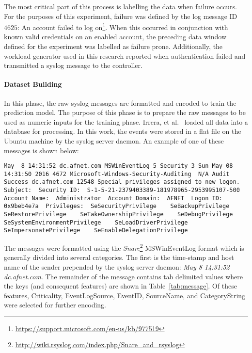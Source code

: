 The most critical part of this process is labelling the data when failure
occurs.  For the purposes of this experiment, failure was defined by the log
message ID $4625$: An account failed to log
on\footnote{\url{https://support.microsoft.com/en-us/kb/977519}}.  When this
occurred in conjunction with known valid credentials on an enabled account, the
preceding data window defined for the experiment was labelled as failure prone.
Additionally, the workload generator used in this research reported when
authentication failed and transmitted a syslog message to the controller.  

\paragraph{Dataset Building} \label{sec:dataset.building}
In this phase, the raw syslog messages are formatted and encoded to train the
prediction model.  The purpose of this phase is to prepare the raw messages to
be used as numeric inputs for the training phase.  Irrera, et
al.~\cite{irrera2015} loaded all data into a database for processing.  In this
work, the events were stored in a flat file on the Ubuntu machine by
the syslog server daemon.  An example of one of these messages is shown below:

\begin{lstlisting}
May  8 14:31:52 dc.afnet.com MSWinEventLog 5 Security 3 Sun May 08 14:31:50 2016 4672 Microsoft-Windows-Security-Auditing  N/A Audit Success dc.afnet.com 12548 Special privileges assigned to new logon.  Subject:  Security ID:  S-1-5-21-2379403389-181978965-2953995107-500  Account Name:  Administrator  Account Domain:  AFNET  Logon ID:  0x9beb4e7a  Privileges:  SeSecurityPrivilege    SeBackupPrivilege    SeRestorePrivilege    SeTakeOwnershipPrivilege    SeDebugPrivilege    SeSystemEnvironmentPrivilege    SeLoadDriverPrivilege    SeImpersonatePrivilege    SeEnableDelegationPrivilege
\end{lstlisting}

The messages were formatted using the
\emph{Snare}\footnote{\url{http://wiki.rsyslog.com/index.php/Snare\_and\_rsyslog}}
MSWinEventLog format which is generally divided into several categories.  The
first is the time-stamp and host name of the sender prepended by the syslog
server daemon: \emph{May 8 14:31:52 dc.afnet.com}.  The remainder of the
message contains tab delimited values where the keys (and consequent features)
are shown in Table~\ref{tab:message}.  Of these features, Criticality,
EventLogSource, EventID, SourceName, and CategoryString were selected for
further encoding.

